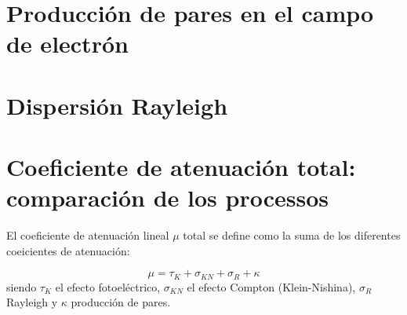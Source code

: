 \section{Producción de pares en el campo de electrón}

\section{Dispersión Rayleigh}

\section{Coeficiente de atenuación total: comparación de los processos}

El coeficiente de atenuación lineal $\mu$ total se define como la suma de los diferentes coeicientes de atenuación: 

\begin{equation}
    \mu = \tau_K + \sigma_{KN} + \sigma_R + \kappa 
\end{equation}
siendo $\tau_K$ el efecto fotoeléctrico, $\sigma_{KN}$ el efecto Compton (Klein-Nishina), $\sigma_R$ Rayleigh y $\kappa$ producción de pares. 
